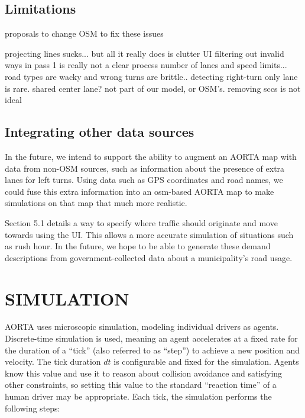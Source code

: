 \documentclass[letterpaper, 10 pt, conference]{ieeeconf}  %
\begin{document}

\subsection{Limitations}

proposals to change OSM to fix these issues

projecting lines sucks... but all it really does is clutter UI
filtering out invalid ways in pass 1 is really not a clear process
number of lanes and speed limits... road types are wacky and wrong
turns are brittle.. detecting right-turn only lane is rare. shared center lane?
  not part of our model, or OSM's.
removing sccs is not ideal


\subsection{Integrating other data sources}

In the future, we intend to support the ability to augment an AORTA map with
data from non-OSM sources, such as information about the presence of extra lanes
for left turns. Using data such as GPS coordinates and road names, we could fuse
this extra information into an osm-based AORTA map to make simulations on that map
that much more realistic.

Section 5.1 details a way to specify where traffic should originate and move
towards using the UI. This allows a more accurate simulation of situations such
as rush hour. In the future, we hope to be able to generate these demand
descriptions from government-collected data about a municipality's road usage.


\section{SIMULATION}

AORTA uses microscopic simulation, modeling individual drivers as agents.
Discrete-time simulation is used, meaning an agent accelerates at a fixed rate
for the duration of a ``tick'' (also referred to as ``step'') to achieve a new
position and velocity. The tick duration $dt$ is configurable and fixed for the
simulation. Agents know this value and use it to reason about collision
avoidance and satisfying other constraints, so setting this value to the
standard ``reaction time'' of a human driver may be appropriate. Each tick, the
simulation performs the following steps:
\end{document}
